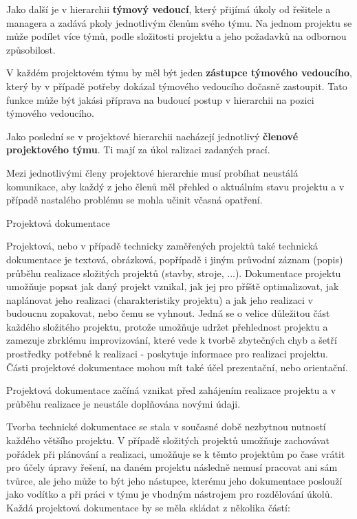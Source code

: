 Jako další je v hierarchii {\bf týmový vedoucí}, který přijímá úkoly od řešitele a managera a zadává pkoly jednotlivým členům svého týmu. Na jednom projektu se může podílet více týmů, podle složitosti projektu a jeho požadavků na odbornou způsobilost. 

V každém projektovém týmu by měl být jeden {\bf zástupce týmového vedoucího}, který by v případě potřeby dokázal týmového vedoucího dočasně zastoupit. Tato funkce může být jakási příprava na budoucí postup v hierarchii na pozici týmového vedoucího. 

Jako poslední se v projektové hierarchii nacházejí jednotlivý {\bf členové projektového týmu}. Ti mají za úkol ralizaci zadaných prací.

Mezi jednotlivými členy projektové hierarchie musí probíhat neustálá komunikace, aby každý z jeho členů měl přehled o aktuálním stavu projektu a v případě nastalého problému se mohla učinit včasná opatření.

\chap Projektová dokumentace

Projektová, nebo v případě technicky zaměřených projektů také technická dokumentace je textová, obrázková, popřípadě i jiným průvodní záznam (popis) průběhu realizace složitých projektů (stavby, stroje, ...). Dokumentace projektu umožňuje popsat jak daný projekt vznikal, jak jej pro příště optimalizovat, jak naplánovat jeho realizaci (charakteristiky projektu) a jak jeho realizaci v budoucnu zopakovat, nebo čemu se vyhnout. Jedná se o velice důležitou část každého složitého projektu, protože umožňuje udržet přehlednost projektu a zamezuje zbrklému improvizování, které vede k tvorbě zbytečných chyb a šetří prostředky potřebné k realizaci - poskytuje informace pro realizaci projektu. Části projektové dokumentace mohou mít také účel prezentační, nebo orientační.

Projektová dokumentace začíná vznikat před zahájením realizace projektu a v průběhu realizace je neustále doplňována novými údaji. 

Tvorba technické dokumentace se stala v současné době nezbytnou nutností každého většího projektu. V případě složitých projektů umožňuje zachovávat pořádek při plánování a realizaci, umožňuje se k těmto projektům po čase vrátit pro účely úpravy řešení, na daném projektu následně nemusí pracovat ani sám tvůrce, ale jeho může to být jeho nástupce, kterému jeho
dokumentace poslouží jako vodítko a při práci v týmu je vhodným nástrojem pro rozdělování úkolů.
Každá projektová dokumentace by se měla skládat z několika částí:

